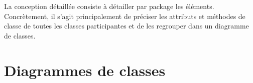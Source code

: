 \par La conception détaillée consiste à détailler par package les éléments. Concrètement, il s’agit principalement de préciser les attributs et méthodes de classe de toutes les classes participantes et de les regrouper dans un diagramme de classes.

	\section{Diagrammes de classes}

